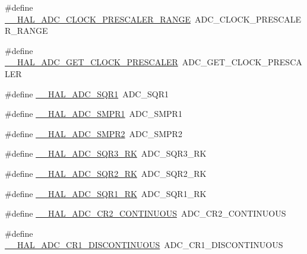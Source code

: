 \begin{DoxyCompactItemize}
\item 
\#define \hyperlink{group___h_a_l___a_d_c___aliased___macros_gad371b9c9ce847537972a0bc6c1422c45}{\+\_\+\+\_\+\+H\+A\+L\+\_\+\+A\+D\+C\+\_\+\+C\+L\+O\+C\+K\+\_\+\+P\+R\+E\+S\+C\+A\+L\+E\+R\+\_\+\+R\+A\+N\+GE}~A\+D\+C\+\_\+\+C\+L\+O\+C\+K\+\_\+\+P\+R\+E\+S\+C\+A\+L\+E\+R\+\_\+\+R\+A\+N\+GE
\item 
\#define \hyperlink{group___h_a_l___a_d_c___aliased___macros_ga0595fba00a50ea5ba7b8baf4cbdd6820}{\+\_\+\+\_\+\+H\+A\+L\+\_\+\+A\+D\+C\+\_\+\+G\+E\+T\+\_\+\+C\+L\+O\+C\+K\+\_\+\+P\+R\+E\+S\+C\+A\+L\+ER}~A\+D\+C\+\_\+\+G\+E\+T\+\_\+\+C\+L\+O\+C\+K\+\_\+\+P\+R\+E\+S\+C\+A\+L\+ER
\item 
\#define \hyperlink{group___h_a_l___a_d_c___aliased___macros_ga7355b4d9c49af127fdb5a1dd7e8b66f0}{\+\_\+\+\_\+\+H\+A\+L\+\_\+\+A\+D\+C\+\_\+\+S\+Q\+R1}~A\+D\+C\+\_\+\+S\+Q\+R1
\item 
\#define \hyperlink{group___h_a_l___a_d_c___aliased___macros_gad8e081521ef7ee963c7833376f52dbfd}{\+\_\+\+\_\+\+H\+A\+L\+\_\+\+A\+D\+C\+\_\+\+S\+M\+P\+R1}~A\+D\+C\+\_\+\+S\+M\+P\+R1
\item 
\#define \hyperlink{group___h_a_l___a_d_c___aliased___macros_gabd50880ede02b19440d1dbc549b19e8f}{\+\_\+\+\_\+\+H\+A\+L\+\_\+\+A\+D\+C\+\_\+\+S\+M\+P\+R2}~A\+D\+C\+\_\+\+S\+M\+P\+R2
\item 
\#define \hyperlink{group___h_a_l___a_d_c___aliased___macros_ga999c539ac6b3b5ab766461e70dadf0a2}{\+\_\+\+\_\+\+H\+A\+L\+\_\+\+A\+D\+C\+\_\+\+S\+Q\+R3\+\_\+\+RK}~A\+D\+C\+\_\+\+S\+Q\+R3\+\_\+\+RK
\item 
\#define \hyperlink{group___h_a_l___a_d_c___aliased___macros_ga6821ae59c39afefd2644d278974b2ab6}{\+\_\+\+\_\+\+H\+A\+L\+\_\+\+A\+D\+C\+\_\+\+S\+Q\+R2\+\_\+\+RK}~A\+D\+C\+\_\+\+S\+Q\+R2\+\_\+\+RK
\item 
\#define \hyperlink{group___h_a_l___a_d_c___aliased___macros_ga907ae83ff38403071ff564a44d5ad3cb}{\+\_\+\+\_\+\+H\+A\+L\+\_\+\+A\+D\+C\+\_\+\+S\+Q\+R1\+\_\+\+RK}~A\+D\+C\+\_\+\+S\+Q\+R1\+\_\+\+RK
\item 
\#define \hyperlink{group___h_a_l___a_d_c___aliased___macros_ga8b8d36727b15f9d630f633e453c8dc59}{\+\_\+\+\_\+\+H\+A\+L\+\_\+\+A\+D\+C\+\_\+\+C\+R2\+\_\+\+C\+O\+N\+T\+I\+N\+U\+O\+US}~A\+D\+C\+\_\+\+C\+R2\+\_\+\+C\+O\+N\+T\+I\+N\+U\+O\+US
\item 
\#define \hyperlink{group___h_a_l___a_d_c___aliased___macros_ga0906f1443571a5dc173f0a1561f514f4}{\+\_\+\+\_\+\+H\+A\+L\+\_\+\+A\+D\+C\+\_\+\+C\+R1\+\_\+\+D\+I\+S\+C\+O\+N\+T\+I\+N\+U\+O\+US}~A\+D\+C\+\_\+\+C\+R1\+\_\+\+D\+I\+S\+C\+O\+N\+T\+I\+N\+U\+O\+US

\end{DoxyCompactItemize}
